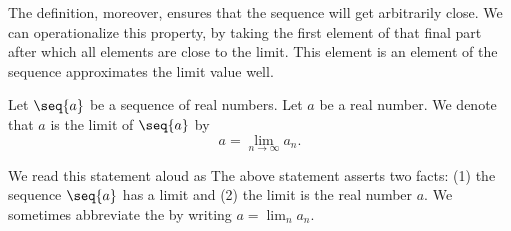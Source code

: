 The definition, moreover,
ensures that the sequence
will get arbitrarily close.
We can operationalize this
property, by taking the first
element of that final part
after which all elements are
close to the limit.
This element is an element
of the sequence approximates
the limit value well.


Let $\seq{a}$
be a sequence of
real numbers.
Let $a$ be a real number.
We denote that $a$ is the limit of
$\seq{a}$ by
\[
  a = \lim_{n \to \infty} a_n.
\]

We read this statement aloud as
The above statement asserts two
facts: (1) the sequence
$\seq{a}$ has a limit and (2)
the limit is the real number $a$.
We sometimes abbreviate
the by writing
$a = \lim_{n} a_n$.

\strats
